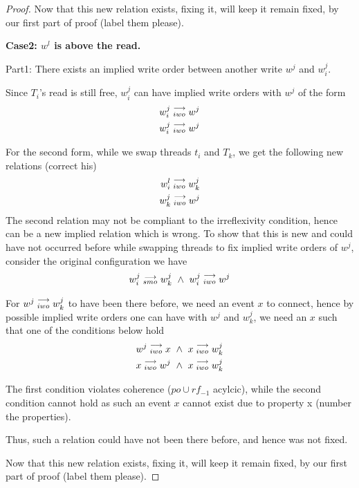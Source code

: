 \begin{proof}
                    Now that this new relation exists, fixing it, will keep it remain fixed, by our first part of proof (label them please). 
                    
            
            \textbf{Case2: $w^l$ is above the read.}
                
                Part1: There exists an implied write order between another write $w^j$ and $w_i^j$.

                Since $T_i$'s read is still free, $w_i^j$ can have implied write orders with $w^j$ of the form
                \begin{align}
                    w_i^j\stackrel{\longrightarrow}{_{iwo}}w^j \\
                    w_i^j\stackrel{\longrightarrow}{_{iwo}}w^j 
                \end{align}


                For the second form, while we swap threads $t_i$ and $T_k$, we get the following new relations (correct his)
                \begin{align}
                    w_i^l\stackrel{\longrightarrow}{_{iwo}}w_k^j \\
                    w_k^j\stackrel{\longrightarrow}{_{iwo}}w^j
                \end{align}
                The second relation may not be compliant to the irreflexivity condition, hence can be a new implied relation which is wrong. To show that this is new and could have not occurred before while swapping threads to fix implied write orders of $w^j$, consider the original configuration we have 
                \begin{align}
                    \reln{w_i^j}{smo}{w_k^j} \ \wedge \ \reln{w_i^j}{iwo}{w^j}
                \end{align}

                For $w^j\stackrel{\longrightarrow}{_{iwo}}w_k^j$ to have been there before, we need an event $x$ to connect, hence by possible implied write orders one can have with $w^j$ and $w_k^j$, we need an $x$ such that one of the conditions below hold
                \begin{align}
                    w^j\stackrel{\longrightarrow}{_{iwo}}x \ \wedge \ x\stackrel{\longrightarrow}{_{iwo}}w_k^j \\ 
                    x\stackrel{\longrightarrow}{_{iwo}}w^j \ \wedge \ x\stackrel{\longrightarrow}{_{iwo}}w_k^j
                \end{align}

                The first condition violates coherence ($po \cup rf_{-1}$ acylcic), while the second condition cannot hold as such an event $x$ cannot exist due to property x (number the properties).
                
                Thus, such a relation could have not been there before, and hence was not fixed. 

                Now that this new relation exists, fixing it, will keep it remain fixed, by our first part of proof (label them please).


        \end{proof}

        

   